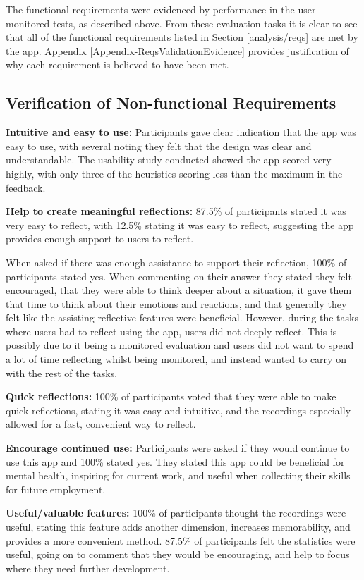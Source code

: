 \documentclass{l4proj}
\begin{document}
The functional requirements were evidenced by performance in the user monitored tests, as described above. From these evaluation tasks it is clear to see that all of the functional requirements listed in Section \ref{analysis/reqs} are met by the app. Appendix \ref{Appendix-ReqsValidationEvidence} provides justification of why each requirement is believed to have been met.

\subsection{Verification of Non-functional Requirements}

\textbf{Intuitive and easy to use:} Participants gave clear indication that the app was easy to use, with several noting they felt that the design was clear and understandable. The usability study conducted showed the app scored very highly, with only three of the heuristics scoring less than the maximum in the feedback. 

\textbf{Help to create meaningful reflections:} 87.5\% of participants stated it was very easy to reflect, with 12.5\% stating it was easy to reflect, suggesting the app provides enough support to users to reflect. 

When asked if there was enough assistance to support their reflection, 100\% of participants stated yes. When commenting on their answer they stated they felt encouraged, that they were able to think deeper about a situation, it gave them that time to think about their emotions and reactions, and that generally they felt like the assisting reflective features were beneficial. However, during the tasks where users had to reflect using the app, users did not deeply reflect. This is possibly due to it being a monitored evaluation and users did not want to spend a lot of time reflecting whilst being monitored, and instead wanted to carry on with the rest of the tasks.

\textbf{Quick reflections:} 100\% of participants voted that they were able to make quick reflections, stating it was easy and intuitive, and the recordings especially allowed for a fast, convenient way to reflect.

\textbf{Encourage continued use:} Participants were asked if they would continue to use this app and 100\% stated yes. They stated this app could be beneficial for mental health, inspiring for current work, and useful when collecting their skills for future employment. 

\textbf{Useful/valuable features:} 100\% of participants thought the recordings were useful, stating this feature adds another dimension, increases memorability, and provides a more convenient method. 87.5\% of participants felt the statistics were useful, going on to comment that they would be encouraging, and help to focus where they need further development.
\end{document}
